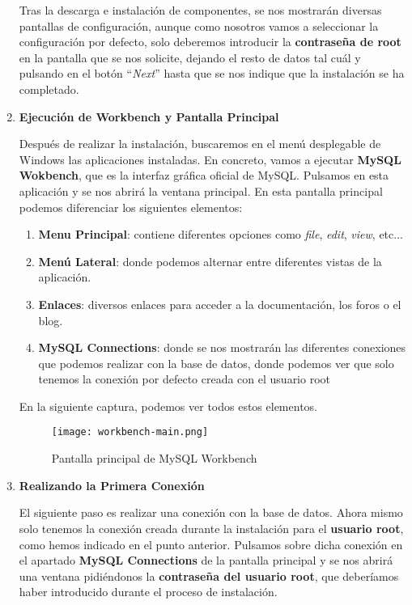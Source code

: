 \begin{enumerate}
    Tras la descarga e instalación de componentes, se nos mostrarán diversas pantallas de configuración, aunque como nosotros vamos a seleccionar la configuración por defecto, solo deberemos introducir la \textbf{contraseña de root} en la pantalla que se nos solicite, dejando el resto de datos tal cuál y pulsando en el botón ``\textit{Next}'' hasta que se nos indique que la instalación se ha completado.

    \item \textbf{Ejecución de Workbench y Pantalla Principal}

    Después de realizar la instalación, buscaremos en el menú desplegable de Windows las aplicaciones instaladas. En concreto, vamos a ejecutar \textbf{MySQL Wokbench}, que es la interfaz gráfica oficial de MySQL. Pulsamos en esta aplicación y se nos abrirá la ventana principal. En esta pantalla principal podemos diferenciar los siguientes  elementos:

    \begin{enumerate}[label=\arabic*.]
        \item \textbf{Menu Principal}: contiene diferentes opciones como \textit{file}, \textit{edit}, \textit{view}, etc...
        \item \textbf{Menú Lateral}: donde podemos alternar entre diferentes vistas de la aplicación.
        \item \textbf{Enlaces}: diversos enlaces para acceder a la documentación, los foros o el blog.
        \item \textbf{MySQL Connections}: donde se nos mostrarán las diferentes conexiones que podemos realizar con la base de datos, donde podemos ver que solo tenemos la conexión por defecto creada con el usuario root
    \end{enumerate}

    En la siguiente captura, podemos ver todos estos elementos.

    \begin{figure}[ht]
        \centering
        \texttt{[image: workbench-main.png]}
        \caption{Pantalla principal de MySQL Workbench}
    \end{figure}


    \item \textbf{Realizando la Primera Conexión}

    El siguiente paso es realizar una conexión con la base de datos. Ahora mismo solo tenemos la conexión creada durante la instalación para el \textbf{usuario root}, como hemos indicado en el punto anterior. Pulsamos sobre dicha conexión en el apartado \textbf{MySQL Connections} de la pantalla principal y se nos abrirá una ventana pidiéndonos la \textbf{contraseña del usuario root}, que deberíamos haber introducido durante el proceso de instalación.


\end{enumerate}
